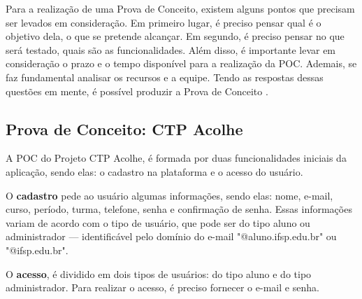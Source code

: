 \documentclass[12pt,a4paper]{article}
\begin{document}
Para a realização de uma Prova de Conceito, existem alguns pontos que precisam ser levados em consideração. Em primeiro lugar, é preciso pensar qual é o objetivo dela, o que se pretende alcançar. Em segundo, é preciso pensar no que será testado, quais são as funcionalidades. Além disso, é importante levar em consideração o prazo e o tempo disponível para a realização da \ac{POC}. Ademais, se faz fundamental analisar os recursos e a equipe. Tendo as respostas dessas questões em mente, é possível produzir a Prova de Conceito \cite{gaspar} \cite{supero}.

\subsection{Prova de Conceito: CTP Acolhe}
A \ac{POC} do Projeto \gls{CTP Acolhe}, é formada por duas funcionalidades iniciais da aplicação, sendo elas: o cadastro na plataforma e o acesso do usuário. 

O \textbf{cadastro} pede ao usuário algumas informações, sendo elas: nome, e-mail, curso, período, turma, telefone, senha e confirmação de senha. Essas informações variam de acordo com o tipo de usuário, que pode ser do tipo aluno ou administrador — identificável pelo domínio do e-mail "@aluno.ifsp.edu.br" ou "@ifsp.edu.br".

O \textbf{acesso}, é dividido em dois tipos de usuários: do tipo aluno e do tipo administrador. Para realizar o acesso, é preciso fornecer o e-mail e senha. 
\end{document}
